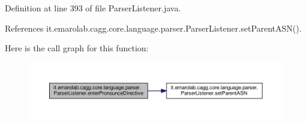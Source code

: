 Definition at line 393 of file Parser\-Listener.\-java.



References it.\-emarolab.\-cagg.\-core.\-language.\-parser.\-Parser\-Listener.\-set\-Parent\-A\-S\-N().



Here is the call graph for this function\-:\nopagebreak
\begin{figure}[H]
\begin{center}
\leavevmode
\includegraphics[width=350pt]{classit_1_1emarolab_1_1cagg_1_1core_1_1language_1_1parser_1_1ParserListener_a406db0f03178494cbd8970993eb3b260_cgraph}
\end{center}
\end{figure}


